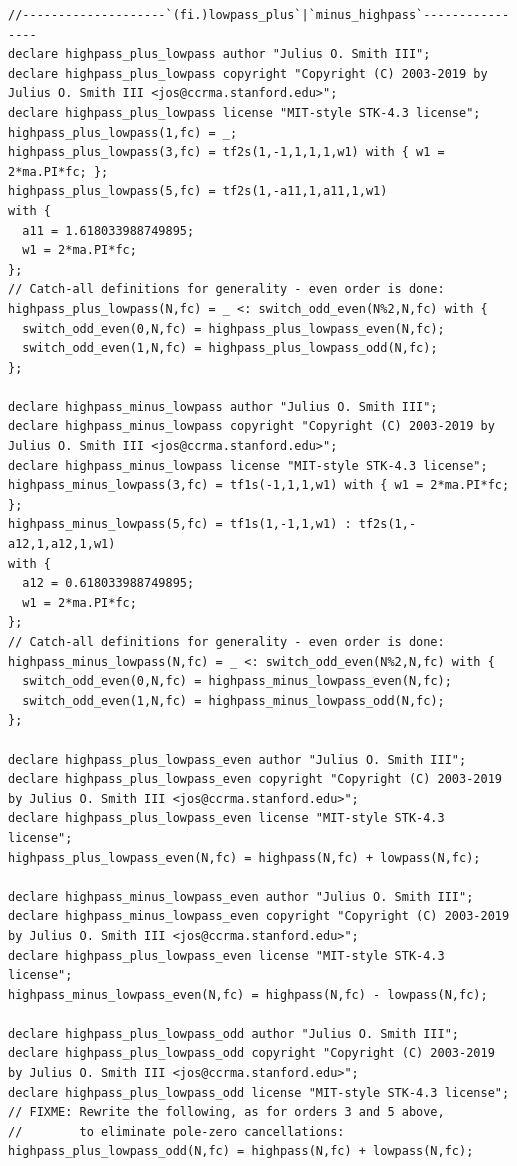 \documentclass{article}
\begin{document}
\begin{lstlisting}[caption=\texttt{filters.lib}]
//--------------------`(fi.)lowpass_plus`|`minus_highpass`----------------
declare highpass_plus_lowpass author "Julius O. Smith III";
declare highpass_plus_lowpass copyright "Copyright (C) 2003-2019 by Julius O. Smith III <jos@ccrma.stanford.edu>";
declare highpass_plus_lowpass license "MIT-style STK-4.3 license";
highpass_plus_lowpass(1,fc) = _;
highpass_plus_lowpass(3,fc) = tf2s(1,-1,1,1,1,w1) with { w1 = 2*ma.PI*fc; };
highpass_plus_lowpass(5,fc) = tf2s(1,-a11,1,a11,1,w1)
with {
  a11 = 1.618033988749895;
  w1 = 2*ma.PI*fc;
};
// Catch-all definitions for generality - even order is done:
highpass_plus_lowpass(N,fc) = _ <: switch_odd_even(N%2,N,fc) with {
  switch_odd_even(0,N,fc) = highpass_plus_lowpass_even(N,fc);
  switch_odd_even(1,N,fc) = highpass_plus_lowpass_odd(N,fc);
};

declare highpass_minus_lowpass author "Julius O. Smith III";
declare highpass_minus_lowpass copyright "Copyright (C) 2003-2019 by Julius O. Smith III <jos@ccrma.stanford.edu>";
declare highpass_minus_lowpass license "MIT-style STK-4.3 license";
highpass_minus_lowpass(3,fc) = tf1s(-1,1,1,w1) with { w1 = 2*ma.PI*fc; };
highpass_minus_lowpass(5,fc) = tf1s(1,-1,1,w1) : tf2s(1,-a12,1,a12,1,w1)
with {
  a12 = 0.618033988749895;
  w1 = 2*ma.PI*fc;
};
// Catch-all definitions for generality - even order is done:
highpass_minus_lowpass(N,fc) = _ <: switch_odd_even(N%2,N,fc) with {
  switch_odd_even(0,N,fc) = highpass_minus_lowpass_even(N,fc);
  switch_odd_even(1,N,fc) = highpass_minus_lowpass_odd(N,fc);
};

declare highpass_plus_lowpass_even author "Julius O. Smith III";
declare highpass_plus_lowpass_even copyright "Copyright (C) 2003-2019 by Julius O. Smith III <jos@ccrma.stanford.edu>";
declare highpass_plus_lowpass_even license "MIT-style STK-4.3 license";
highpass_plus_lowpass_even(N,fc) = highpass(N,fc) + lowpass(N,fc);

declare highpass_minus_lowpass_even author "Julius O. Smith III";
declare highpass_minus_lowpass_even copyright "Copyright (C) 2003-2019 by Julius O. Smith III <jos@ccrma.stanford.edu>";
declare highpass_plus_lowpass_even license "MIT-style STK-4.3 license";
highpass_minus_lowpass_even(N,fc) = highpass(N,fc) - lowpass(N,fc);

declare highpass_plus_lowpass_odd author "Julius O. Smith III";
declare highpass_plus_lowpass_odd copyright "Copyright (C) 2003-2019 by Julius O. Smith III <jos@ccrma.stanford.edu>";
declare highpass_plus_lowpass_odd license "MIT-style STK-4.3 license";
// FIXME: Rewrite the following, as for orders 3 and 5 above,
//        to eliminate pole-zero cancellations:
highpass_plus_lowpass_odd(N,fc) = highpass(N,fc) + lowpass(N,fc);


\end{lstlisting}
\end{document}
